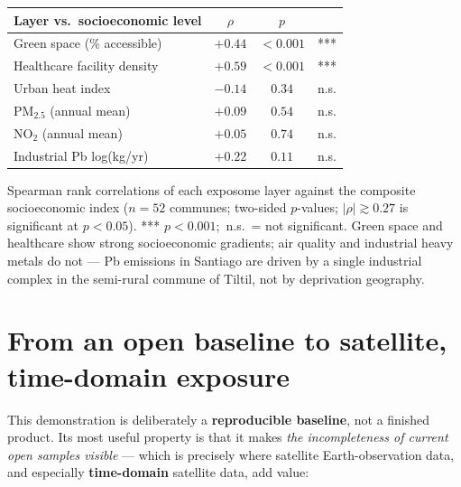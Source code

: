 \documentclass[10pt,a4paper]{article}
\begin{document}
\smallskip
{\centering
\small
\begin{tabular}{l c c c}
\hline
\textcolor{softpink}{\textbf{Layer vs.\ socioeconomic level}} & \textbf{$\rho$} & \textbf{$p$} & \\
\hline
Green space (\% accessible)   & $+0.44$ & $<0.001$ & *** \\
Healthcare facility density   & $+0.59$ & $<0.001$ & *** \\
Urban heat index              & $-0.14$ & $0.34$   & n.s. \\
PM$_{2.5}$ (annual mean)      & $+0.09$ & $0.54$   & n.s. \\
NO$_2$ (annual mean)          & $+0.05$ & $0.74$   & n.s. \\
Industrial Pb log(kg/yr)      & $+0.22$ & $0.11$   & n.s. \\
\hline
\end{tabular}\par}
\smallskip
{\footnotesize Spearman rank correlations of each exposome layer against the composite socioeconomic index ($n=52$ communes; two-sided $p$-values; $|\rho|\gtrsim0.27$ is significant at $p<0.05$). *** $p<0.001$;\ n.s.\ = not significant. Green space and healthcare show strong socioeconomic gradients; air quality and industrial heavy metals do not --- Pb emissions in Santiago are driven by a single industrial complex in the semi-rural commune of Tiltil, not by deprivation geography.}

\section{From an open baseline to satellite, time-domain exposure}

This demonstration is deliberately a \textbf{reproducible baseline}, not a finished product. Its most useful property is that it makes \emph{the incompleteness of current open samples visible} --- which is precisely where satellite Earth-observation data, and especially \textbf{time-domain} satellite data, add value:
\end{document}
